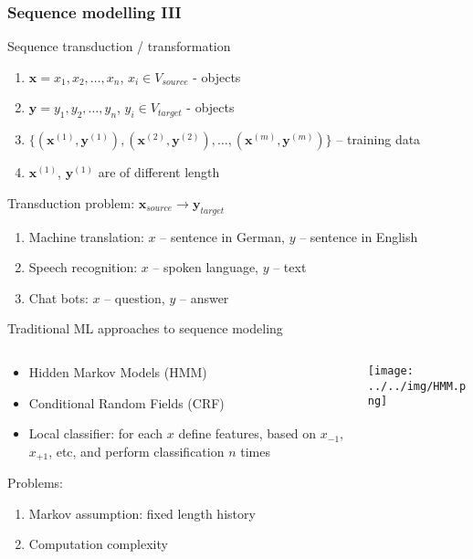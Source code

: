 \documentclass[usenames,dvipsnames,handout,aspectratio=169]{beamer}
\begin{document}
\begin{frame}
\frametitle{Sequence modelling III}

\begin{block}{Sequence transduction / transformation}

\begin{enumerate}


\item $\bm{x} = x_1,x_2,\ldots,x_n $, $x_i \in V_{source}$  - objects
\item $\bm{y} = y_1,y_2,\ldots,y_n $, $y_i \in V_{target}$ - objects 
\item $ \{(\bm{x}^{(1)}, \bm{y}^{(1)} ), (\bm{x}^{(2)}, \bm{y}^{(2)} ),\ldots, (\bm{x}^{(m)}, \bm{y}^{(m)} ) \} $ – training data
\item $\bm{x}^{(1)}$, $\bm{y}^{(1)} $ are of different length

\end{enumerate}

Transduction problem: $\bm{x}_{source} \rightarrow \bm{y}_{target}$ 
	
\end{block}

\begin{enumerate}

	\item Machine translation: $x$ – sentence in German, $y$ – sentence in English
	\item Speech recognition: $x$ – spoken language, $y$ – text
	\item Chat bots: $x$ – question, $y$ – answer
 
\end{enumerate}

\end{frame}


\begin{frame}{Traditional ML approaches to sequence modeling}
\begin{columns}
\begin{column}{0.6\textwidth}

\begin{itemize}
	
\item Hidden Markov Models (HMM)
\item Conditional Random Fields (CRF)
\item Local classifier: for each $x$ define features, based on $x_{-1}$, $x_{+1}$, etc,  and perform classification $n$ times
\end{itemize}

Problems:
\begin{enumerate}
	\item Markov assumption: fixed length history
	\item Computation complexity  
\end{enumerate}
\end{column}
\begin{column}{0.4\textwidth}  %
    \begin{center}
	\texttt{[image: ../../img/HMM.png]}
     \end{center}
\end{column}
\end{columns}
\end{frame}
\end{document}
